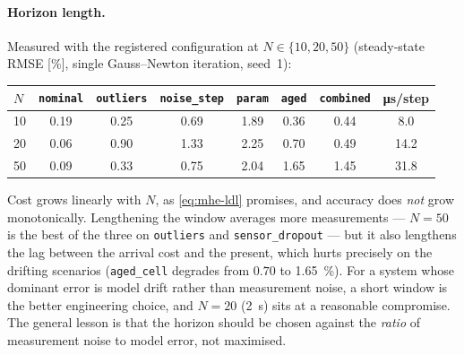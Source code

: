 \paragraph{Horizon length.}  Measured with the registered configuration at $N\in\{10,20,50\}$
(steady-state RMSE [\si{\percent}], single Gauss--Newton iteration, seed~1):
\begin{center}
\begin{tabular}{@{}lccccccc@{}}
\toprule
$N$ & \texttt{nominal} & \texttt{outliers} & \texttt{noise\_step} & \texttt{param} & \texttt{aged} &
\texttt{combined} & \si{\micro\second}/step \\
\midrule
10 & 0.19 & 0.25 & 0.69 & 1.89 & 0.36 & 0.44 & \phantom{0}8.0 \\
20 & 0.06 & 0.90 & 1.33 & 2.25 & 0.70 & 0.49 & 14.2 \\
50 & 0.09 & 0.33 & 0.75 & 2.04 & 1.65 & 1.45 & 31.8 \\
\bottomrule
\end{tabular}
\end{center}
Cost grows linearly with $N$, as \cref{eq:mhe-ldl} promises, and accuracy does \emph{not} grow
monotonically.  Lengthening the window averages more measurements --- $N = 50$ is the best of the
three on \texttt{outliers} and \texttt{sensor\_dropout} --- but it also lengthens the lag between
the arrival cost and the present, which hurts precisely on the drifting scenarios
(\texttt{aged\_cell} degrades from $0.70$ to \SI{1.65}{\percent}).  For a system whose dominant
error is model drift rather than measurement noise, a short window is the better engineering
choice, and $N = 20$ (\SI{2}{\second}) sits at a reasonable compromise.  The general lesson is that
the horizon should be chosen against the \emph{ratio} of measurement noise to model error, not
maximised.

